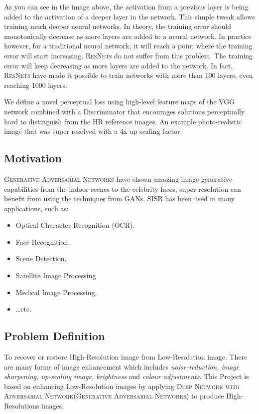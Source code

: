 \documentclass[12pt]{article}
\begin{document}
			As you can see in the image above, the activation from a previous layer is being added to the activation of a deeper layer in the network. This simple tweak allows training much deeper neural networks. In theory, the training error should monotonically decrease as more layers are added to a neural network. In practice however, for a traditional neural network, it will reach a point where the training error will start increasing. \textsc{ResNets} do not suffer from this problem. The training error will keep decreasing as more layers are added to the network. In fact, \textsc{ResNets} have made it possible to train networks with more than 100 layers, even reaching 1000 layers.
			
			We define a novel perceptual loss using high-level feature maps of the VGG network combined with a Discriminator that encourages solutions perceptually hard to distinguish from the HR reference images. An example photo-realistic image that was super resolved with a 4x up scaling factor.
		\subsection{Motivation}
			\textsc{Generative Adversarial Networks} have shown amazing image generative capabilities from the indoor scenes to the celebrity faces, super resolution can benefit from using the techniques from GANs. SISR has been used in many applications, such as:
			\begin{itemize}
				\item Optical Character Recognition (OCR).
				\item Face Recognition.
				\item Scene Detection.
				\item Satellite Image Processing
				\item Medical Image Processing.
				\item …etc.
			\end{itemize}
		\subsection{Problem Definition}
			To recover or restore High-Resolution image from Low-Resolution image. There are many forms of image enhancement which includes \textit{noise-reduction, image sharpening, up-scaling image, brightness} and \textit{colour adjustments}. This Project is based on enhancing Low-Resolution images by applying \textsc{Deep Network with Adversarial Network(Generative Adversarial Networks)} to produce High-Resolutions images.
			
\end{document}
